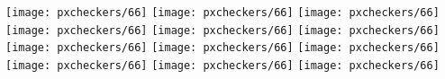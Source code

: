 \documentclass[12pt]{article}
\begin{document}
\hfill\texttt{[image: pxcheckers/66]}%
\hfill\texttt{[image: pxcheckers/66]}%
\hfill\texttt{[image: pxcheckers/66]}\hfill~
\vfill~
\hfill\texttt{[image: pxcheckers/66]}%
\hfill\texttt{[image: pxcheckers/66]}%
\hfill\texttt{[image: pxcheckers/66]}\hfill~
\vfill~
\hfill\texttt{[image: pxcheckers/66]}%
\hfill\texttt{[image: pxcheckers/66]}%
\hfill\texttt{[image: pxcheckers/66]}\hfill~
\vfill~
\hfill\texttt{[image: pxcheckers/66]}%
\hfill\texttt{[image: pxcheckers/66]}%
\hfill\texttt{[image: pxcheckers/66]}\hfill~
\vfill~
\end{document}
